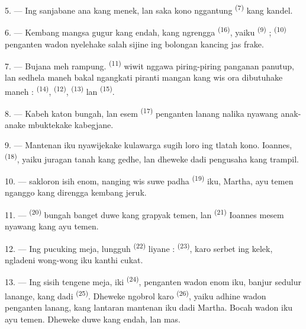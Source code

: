 5. --- Ing sanjabane  ana  kang
menek, lan saka kono nggantung 
\textsuperscript{(7)} kang kandel.

6. --- Kembang mangsa gugur kang endah, kang ngrengga 
\textsuperscript{(16)}, yaiku  \textsuperscript{(9)} ;
 \textsuperscript{(10)} penganten wadon nyelehake salah
sijine ing bolongan kancing jas frake.

7. --- Bujana meh rampung.  \textsuperscript{(11)} wiwit
nggawa piring-piring panganan panutup, lan sedhela maneh bakal
ngangkati piranti mangan kang wis ora dibutuhake maneh :
 \textsuperscript{(14)}, 
\textsuperscript{(12)},  \textsuperscript{(13)} lan
 \textsuperscript{(15)}.

\VUsaut{3.0mm}

8. --- Kabeh katon bungah, lan esem  \textsuperscript{(17)}
penganten lanang nalika nyawang anak-anake mbuktekake kabegjane.

9. --- Mantenan iku nyawijekake kulawarga sugih loro ing tlatah kono.
Ioannes,  \textsuperscript{(18)}, yaiku
 juragan tanah kang gedhe, lan dheweke dadi
 pengusaha kang trampil.

10. ---  sakloron isih enom, nanging wis suwe padha
  \textsuperscript{(19)} iku,
Martha, ayu temen nganggo  kang direngga kembang
jeruk.

11. ---  \textsuperscript{(20)} bungah banget
duwe  kang grapyak temen, lan  \textsuperscript{(21)} Ioannes mesem nyawang  kang ayu temen.

12. --- Ing pucuking meja, lungguh 
\textsuperscript{(22)} liyane :  
\textsuperscript{(23)}, karo serbet ing kelek, ngladeni wong-wong iku
kanthi cukat.

\VUsaut{3.0mm}

13. --- Ing sisih tengene meja, iki  \textsuperscript{(24)},
 penganten wadon enom iku, banjur sedulur lanange, kang
dadi  \textsuperscript{(25)}. Dheweke
ngobrol karo  \textsuperscript{(26)},
yaiku adhine wadon penganten lanang, kang lantaran mantenan iku dadi
 Martha. Bocah wadon iku ayu temen. Dheweke duwe
 kang endah,  lan
 mas.

